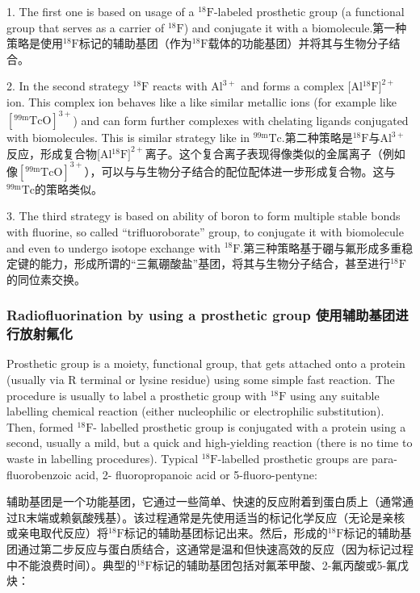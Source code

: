 \documentclass[dvipsnames, svgnames,a4paper,11pt]{article}
\begin{document}
1. The first one is based on usage of a ${}^\mathrm{18}\mathrm{F}$-labeled prosthetic group (a functional
group that serves as a carrier of ${}^\mathrm{18}\mathrm{F}$) and conjugate it with a biomolecule.第一种策略是使用${}^\mathrm{18}\mathrm{F}$标记的辅助基团（作为${}^\mathrm{18}\mathrm{F}$载体的功能基团）并将其与生物分子结合。


2. In the second strategy ${}^\mathrm{18}\mathrm{F}$ reacts with $\mathrm{Al}^{3+}$ and forms a complex [Al${}^\mathrm{18}\mathrm{F}]^{2+}$ ion.
This complex ion behaves like a like similar metallic ions (for example like
$[{}^\mathrm{99m}\mathrm{TcO}]^{3+}$) and can form further complexes with chelating ligands conjugated
with biomolecules. This is similar strategy like in \(\mathrm{{}^{99m}Tc}\).第二种策略是${}^\mathrm{18}\mathrm{F}$与$\mathrm{Al}^{3+}$反应，形成复合物[Al${}^\mathrm{18}\mathrm{F}]^{2+}$离子。这个复合离子表现得像类似的金属离子（例如像$[{}^\mathrm{99m}\mathrm{TcO}]^{3+}$），可以与与生物分子结合的配位配体进一步形成复合物。这与\(\mathrm{{}^{99m}Tc}\)的策略类似。

3. The third strategy is based on ability of boron to form multiple stable bonds
with fluorine, so called “trifluoroborate” group, to conjugate it with biomolecule
and even to undergo isotope exchange with ${}^\mathrm{18}\mathrm{F}$.第三种策略基于硼与氟形成多重稳定键的能力，形成所谓的“三氟硼酸盐”基团，将其与生物分子结合，甚至进行${}^\mathrm{18}\mathrm{F}$的同位素交换。

\subsubsection{Radiofluorination by using a prosthetic group 使用辅助基团进行放射氟化}

Prosthetic group is a moiety, functional group, that gets attached onto a protein
(usually via R terminal or lysine residue) using some simple fast reaction. The
procedure is usually to label a prosthetic group with ${}^\mathrm{18}\mathrm{F}$ using any suitable labelling
chemical reaction (either nucleophilic or electrophilic substitution). Then, formed ${}^\mathrm{18}\mathrm{F}$-
labelled prosthetic group is conjugated with a protein using a second, usually a mild,
but a quick and high-yielding reaction (there is no time to waste in labelling
procedures). Typical ${}^\mathrm{18}\mathrm{F}$-labelled prosthetic groups are para-fluorobenzoic acid, 2-
fluoropropanoic acid or 5-fluoro-pentyne:

辅助基团是一个功能基团，它通过一些简单、快速的反应附着到蛋白质上（通常通过R末端或赖氨酸残基）。该过程通常是先使用适当的标记化学反应（无论是亲核或亲电取代反应）将${}^\mathrm{18}\mathrm{F}$标记的辅助基团标记出来。然后，形成的${}^\mathrm{18}\mathrm{F}$标记的辅助基团通过第二步反应与蛋白质结合，这通常是温和但快速高效的反应（因为标记过程中不能浪费时间）。典型的${}^\mathrm{18}\mathrm{F}$标记的辅助基团包括对氟苯甲酸、2-氟丙酸或5-氟戊炔：
\end{document}
